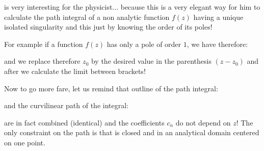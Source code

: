 	is very interesting for the physicist... because this is a very elegant way for him to calculate the path integral of a non analytic function $f(z)$ having a unique isolated singularity and this just by knowing the order of its poles!
	
	For example if a function $f(z)$ has only a pole of order $1$, we have therefore:
	
	and we replace therefore $z_0$ by the desired value in the parenthesis $(z-z_0)$ and after we calculate the limit between brackets!
	
	Now to go more fare, let us remind that outline of the path integral:
	
	and the curvilinear path of the integral:
	
	are in fact combined (identical) and the coefficients $c_n$ do not depend on $z$! The only constraint on the path is that is closed and in an analytical domain centered on one point.
	
